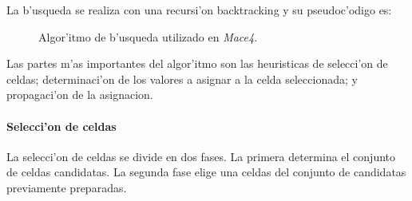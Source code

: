 La b'usqueda se realiza con una recursi'on backtracking y su pseudoc'odigo es:

\begin{figure}[htbp]
\caption{Algor'itmo de b'usqueda utilizado en \textit{Mace4}.}
\label{fig:mace4_busqueda}
\end{figure}

Las partes m'as importantes del algor'itmo son las heuristicas de selecci'on de celdas; determinaci'on de los valores a asignar a la celda seleccionada; y propagaci'on de la asignacion.

\paragraph{Selecci'on de celdas}

La selecci'on de celdas se divide en dos fases. La primera determina el conjunto de celdas candidatas. La segunda fase elige una celdas del conjunto de candidatas previamente preparadas.

